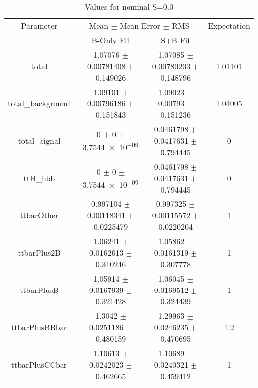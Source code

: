\begin{table}
\centering
\caption{Values for nominal S=0.0}
\begin{tabular}{cccc}
\toprule
Parameter & \multicolumn{2}{c}{Mean $\pm$ Mean Error $\pm$ RMS} & Expectation\\
 & B-Only Fit & S+B Fit & \\
\midrule
total & \num{1.07076} $\pm$ \num{0.00781408} $\pm$ \num{0.149026} & \num{1.07085} $\pm$ \num{0.00780203} $\pm$ \num{0.148796} & \num{1.01101}\\
total\_background & \num{1.09101} $\pm$ \num{0.00796186} $\pm$ \num{0.151843} & \num{1.09023} $\pm$ \num{0.00793} $\pm$ \num{0.151236} & \num{1.04005}\\
total\_signal & \num{0} $\pm$ \num{0} $\pm$ \num{3.7544e-09} & \num{0.0461798} $\pm$ \num{0.0417631} $\pm$ \num{0.794445} & \num{0}\\
ttH\_hbb & \num{0} $\pm$ \num{0} $\pm$ \num{3.7544e-09} & \num{0.0461798} $\pm$ \num{0.0417631} $\pm$ \num{0.794445} & \num{0}\\
ttbarOther & \num{0.997104} $\pm$ \num{0.00118341} $\pm$ \num{0.0225479} & \num{0.997325} $\pm$ \num{0.00115572} $\pm$ \num{0.0220204} & \num{1}\\
ttbarPlus2B & \num{1.06241} $\pm$ \num{0.0162613} $\pm$ \num{0.310246} & \num{1.05862} $\pm$ \num{0.0161319} $\pm$ \num{0.307778} & \num{1}\\
ttbarPlusB & \num{1.05914} $\pm$ \num{0.0167939} $\pm$ \num{0.321428} & \num{1.06045} $\pm$ \num{0.0169512} $\pm$ \num{0.324439} & \num{1}\\
ttbarPlusBBbar & \num{1.3042} $\pm$ \num{0.0251186} $\pm$ \num{0.480159} & \num{1.29963} $\pm$ \num{0.0246235} $\pm$ \num{0.470695} & \num{1.2}\\
ttbarPlusCCbar & \num{1.10613} $\pm$ \num{0.0242023} $\pm$ \num{0.462665} & \num{1.10689} $\pm$ \num{0.0240321} $\pm$ \num{0.459412} & \num{1}\\
\bottomrule
\end{tabular}
\end{table}